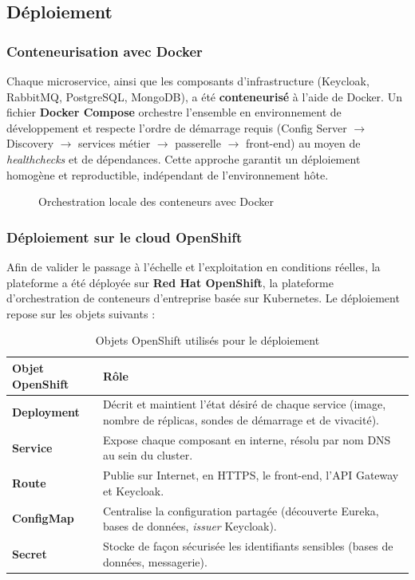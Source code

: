 \subsection{Déploiement}

\subsubsection{Conteneurisation avec Docker}
Chaque microservice, ainsi que les composants d'infrastructure (Keycloak, RabbitMQ,
PostgreSQL, MongoDB), a été \textbf{conteneurisé} à l'aide de Docker. Un fichier
\textbf{Docker Compose} orchestre l'ensemble en environnement de développement et respecte
l'ordre de démarrage requis (Config Server $\rightarrow$ Discovery $\rightarrow$ services
métier $\rightarrow$ passerelle $\rightarrow$ front-end) au moyen de \textit{healthchecks} et
de dépendances. Cette approche garantit un déploiement homogène et reproductible, indépendant
de l'environnement hôte.

\begin{figure}[H]\centering
  \caption{Orchestration locale des conteneurs avec Docker}\label{fig:docker}
\end{figure}

\subsubsection{Déploiement sur le cloud OpenShift}
Afin de valider le passage à l'échelle et l'exploitation en conditions réelles, la plateforme
a été déployée sur \textbf{Red Hat OpenShift}, la plateforme d'orchestration de conteneurs
d'entreprise basée sur Kubernetes. Le déploiement repose sur les objets suivants :

\begin{table}[H]\centering\renewcommand{\arraystretch}{1.3}
\begin{tabular}{|p{3.4cm}|p{10.3cm}|}\hline
\rowcolor{gray!15}\textbf{Objet OpenShift} & \textbf{Rôle} \\ \hline
\textbf{Deployment} & Décrit et maintient l'état désiré de chaque service (image, nombre de
réplicas, sondes de démarrage et de vivacité). \\ \hline
\textbf{Service} & Expose chaque composant en interne, résolu par nom DNS au sein du cluster. \\ \hline
\textbf{Route} & Publie sur Internet, en HTTPS, le front-end, l'API Gateway et Keycloak. \\ \hline
\textbf{ConfigMap} & Centralise la configuration partagée (découverte Eureka, bases de données,
\textit{issuer} Keycloak). \\ \hline
\textbf{Secret} & Stocke de façon sécurisée les identifiants sensibles (bases de données,
messagerie). \\ \hline
\end{tabular}
\caption{Objets OpenShift utilisés pour le déploiement}\label{tab:os-objects}
\end{table}

